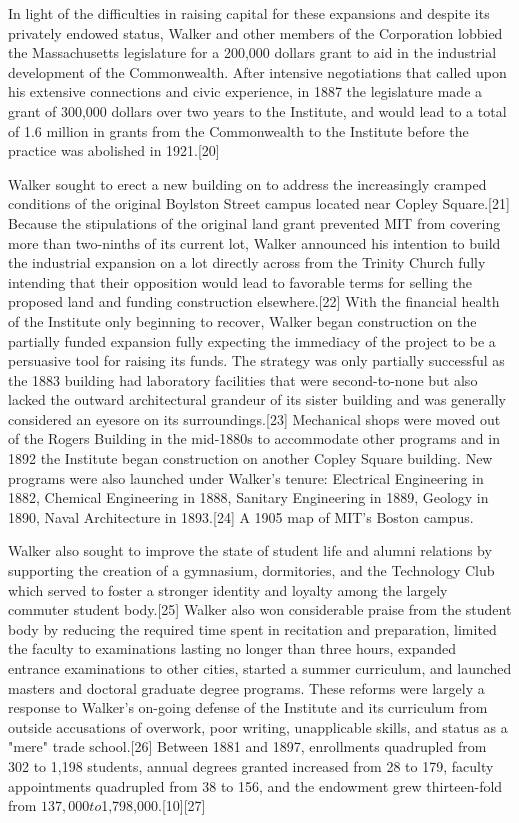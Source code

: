 In light of the difficulties in raising capital for these expansions and despite its privately endowed status, Walker and other members of the Corporation lobbied the Massachusetts legislature for a 200,000 dollars grant to aid in the industrial development of the Commonwealth. After intensive negotiations that called upon his extensive connections and civic experience, in 1887 the legislature made a grant of 300,000 dollars over two years to the Institute, and would lead to a total of 1.6 million in grants from the Commonwealth to the Institute before the practice was abolished in 1921.[20]

Walker sought to erect a new building on to address the increasingly cramped conditions of the original Boylston Street campus located near Copley Square.[21] Because the stipulations of the original land grant prevented MIT from covering more than two-ninths of its current lot, Walker announced his intention to build the industrial expansion on a lot directly across from the Trinity Church fully intending that their opposition would lead to favorable terms for selling the proposed land and funding construction elsewhere.[22] With the financial health of the Institute only beginning to recover, Walker began construction on the partially funded expansion fully expecting the immediacy of the project to be a persuasive tool for raising its funds. The strategy was only partially successful as the 1883 building had laboratory facilities that were second-to-none but also lacked the outward architectural grandeur of its sister building and was generally considered an eyesore on its surroundings.[23] Mechanical shops were moved out of the Rogers Building in the mid-1880s to accommodate other programs and in 1892 the Institute began construction on another Copley Square building. New programs were also launched under Walker's tenure: Electrical Engineering in 1882, Chemical Engineering in 1888, Sanitary Engineering in 1889, Geology in 1890, Naval Architecture in 1893.[24]
A 1905 map of MIT's Boston campus.

Walker also sought to improve the state of student life and alumni relations by supporting the creation of a gymnasium, dormitories, and the Technology Club which served to foster a stronger identity and loyalty among the largely commuter student body.[25] Walker also won considerable praise from the student body by reducing the required time spent in recitation and preparation, limited the faculty to examinations lasting no longer than three hours, expanded entrance examinations to other cities, started a summer curriculum, and launched masters and doctoral graduate degree programs. These reforms were largely a response to Walker's on-going defense of the Institute and its curriculum from outside accusations of overwork, poor writing, unapplicable skills, and status as a "mere" trade school.[26] Between 1881 and 1897, enrollments quadrupled from 302 to 1,198 students, annual degrees granted increased from 28 to 179, faculty appointments quadrupled from 38 to 156, and the endowment grew thirteen-fold from $137,000 to $1,798,000.[10][27]

